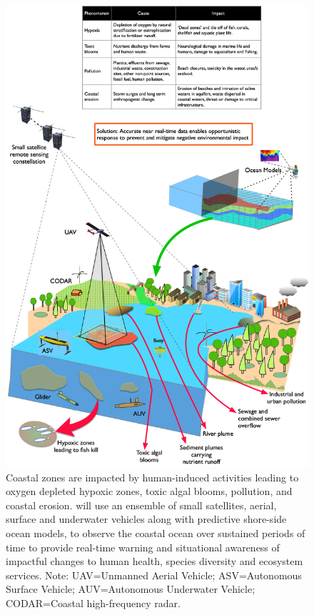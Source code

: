 \begin{figure}[H]
  \centering
  \includegraphics[scale=0.122]{fig/mega-cities-toxic-1.jpg}
  \caption{Coastal zones are impacted by human-induced activities
    leading to oxygen depleted hypoxic zones, toxic algal blooms,
    pollution, and coastal erosion. \pro will use an ensemble of small
    satellites, aerial, surface and underwater vehicles along with
    predictive shore-side ocean models, to observe the coastal ocean
    over sustained periods of time to provide real-time warning and
    situational awareness of impactful changes to human health,
    species diversity and ecosystem services. Note: UAV=Unmanned
    Aerial Vehicle; ASV=Autonomous Surface Vehicle; AUV=Autonomous
    Underwater Vehicle; CODAR=Coastal high-frequency radar.}
    \label{fig:mega-cities}
\end{figure}

